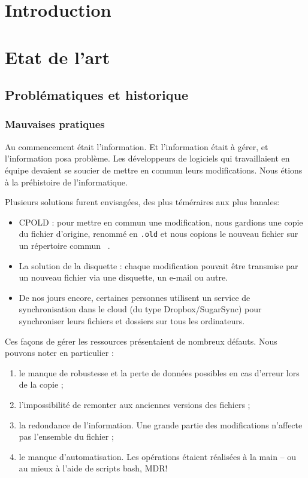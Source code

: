 
\section*{Introduction}

\section{Etat de l'art}

\subsection{Problématiques et historique}


\subsubsection{Mauvaises pratiques}

Au commencement était l'information. Et l'information était à gérer, et l'information posa problème. Les développeurs de logiciels qui travaillaient en équipe devaient se soucier de mettre en commun leurs modifications. 
Nous étions à la préhistoire de l'informatique.

Plusieurs solutions furent envisagées, des plus téméraires aux plus banales:
\begin{itemize}
\item CPOLD : pour mettre en commun une modification, nous gardions une copie du fichier d'origine, renommé en \texttt{.old} et nous copions le nouveau fichier sur un répertoire commun ~\cite{CPOLD-article}. 
\item La solution de la disquette : chaque modification pouvait être transmise par un nouveau fichier via une disquette, un e-mail ou autre.
\item De nos jours encore, certaines personnes utilisent un service de synchronisation dans le cloud (du type Dropbox/SugarSync) pour synchroniser leurs fichiers et dossiers sur tous les ordinateurs. 
\end{itemize}

Ces façons de gérer les ressources présentaient de nombreux défauts. Nous pouvons noter en particulier : 
\begin{enumerate}
\item le manque de robustesse et la perte de données possibles en cas d'erreur lors de la copie ;
\item l'impossibilité de remonter aux anciennes versions des fichiers ;
\item la redondance de l'information. Une grande partie des modifications n'affecte pas l'ensemble du fichier ;
\item le manque d'automatisation. Les opérations étaient réalisées à la main -- ou au mieux à l'aide de scripts bash, MDR! 
\end{enumerate}

